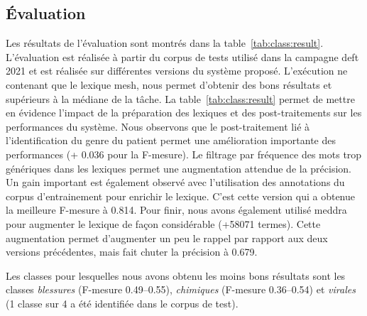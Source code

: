 \subsection{Évaluation}

Les résultats de l'évaluation sont montrés dans la table~\ref{tab:class:result}.
L'évaluation est réalisée à partir du corpus de tests utilisé dans la campagne \gls{deft} 2021 et est réalisée sur différentes versions du système proposé.
L'exécution ne contenant que le lexique \gls{mesh}, nous permet d'obtenir des bons résultats et supérieurs à la médiane de la tâche.
La table~\ref{tab:class:result} permet de mettre en évidence l'impact de la préparation des lexiques et des post-traitements sur les performances du système.
Nous observons que le post-traitement lié à l'identification du genre du patient permet une amélioration importante des performances (+ \num{0,036} pour la F-mesure).
Le filtrage par fréquence des mots trop génériques dans les lexiques permet une augmentation attendue de la précision.
Un gain important est également observé avec l'utilisation des annotations du corpus d'entrainement pour enrichir le lexique.
C'est cette version qui a obtenue la meilleure F-mesure à \num{0,814}.
Pour finir, nous avons également utilisé \gls{meddra} pour augmenter le lexique de façon considérable (+\num{58071} termes).
Cette augmentation permet d'augmenter un peu le rappel par rapport aux deux versions précédentes, mais fait chuter la précision à \num{0,679}.

Les classes pour lesquelles nous avons obtenu les moins bons résultats sont les classes \emph{blessures} (F-mesure \numrange{0,49}{0,55}), \emph{chimiques} (F-mesure \numrange{0,36}{0,54}) et \emph{virales} (1 classe sur 4 a été identifiée dans le corpus de test).


